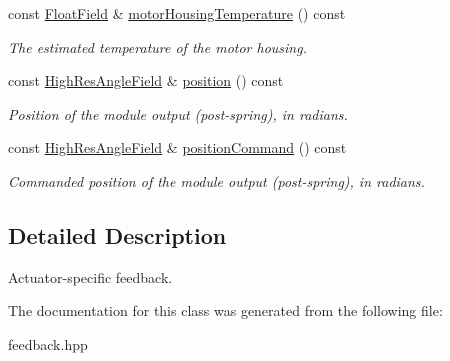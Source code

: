 \begin{DoxyCompactItemize}
const \hyperlink{classhebi_1_1Feedback_1_1FloatField}{Float\+Field} \& \hyperlink{classhebi_1_1Feedback_1_1Actuator_a3b92ce1c90558e9b6f80f82a9be45e3c}{motor\+Housing\+Temperature} () const
\begin{DoxyCompactList}\small\item\em The estimated temperature of the motor housing. \end{DoxyCompactList}\item 
\mbox{\label{classhebi_1_1Feedback_1_1Actuator_a960ff09a3a8a57188e6e7ca9435d9fba}} 
const \hyperlink{classhebi_1_1Feedback_1_1HighResAngleField}{High\+Res\+Angle\+Field} \& \hyperlink{classhebi_1_1Feedback_1_1Actuator_a960ff09a3a8a57188e6e7ca9435d9fba}{position} () const
\begin{DoxyCompactList}\small\item\em Position of the module output (post-\/spring), in radians. \end{DoxyCompactList}\item 
\mbox{\label{classhebi_1_1Feedback_1_1Actuator_ac52ee60b21c703a81c918157ee87b8e4}} 
const \hyperlink{classhebi_1_1Feedback_1_1HighResAngleField}{High\+Res\+Angle\+Field} \& \hyperlink{classhebi_1_1Feedback_1_1Actuator_ac52ee60b21c703a81c918157ee87b8e4}{position\+Command} () const
\begin{DoxyCompactList}\small\item\em Commanded position of the module output (post-\/spring), in radians. \end{DoxyCompactList}\end{DoxyCompactItemize}


\subsection{Detailed Description}
Actuator-\/specific feedback. 

The documentation for this class was generated from the following file\+:\begin{DoxyCompactItemize}
\item 
feedback.\+hpp\end{DoxyCompactItemize}
